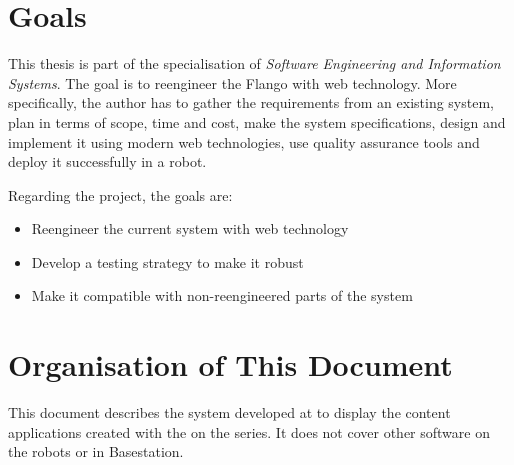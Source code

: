 \section{Goals}
This thesis is part of the specialisation of \emph{Software Engineering and Information Systems}. 
The goal is to reengineer the Flango \cm with web technology.
More specifically, the author has to gather the requirements from an existing system, plan in terms of scope, time and cost, make the system specifications, design and implement it using modern web technologies, use quality assurance tools and deploy it successfully in a  robot.

Regarding the project, the goals are:
\begin{itemize}
	\item Reengineer the current system with web technology
	\item Develop a testing strategy to make it robust
	\item Make it compatible with non-reengineered parts of the system
\end{itemize}


\section{Organisation of This Document}
This document describes the system developed at \company to display the  content applications created with the \se on the  series.
It does not cover other software on the robots or in Basestation.

